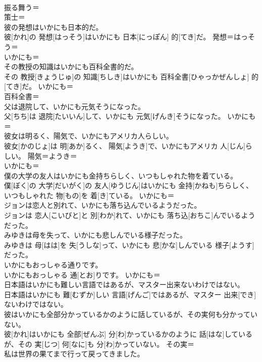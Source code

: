 \documentclass[8pt]{extreport}
\begin{document}
\begin{CJK}{UTF8}{min}
\\	振る舞う＝ 
\\	策士＝ 
\\	彼の発想はいかにも日本的だ。	
\\	彼[かれ]の 発想[はっそう]はいかにも 日本[にっぽん] 的[てき]だ。	発想＝はっそう＝ 
\\	いかにも＝ 
\\	その教授の知識はいかにも百科全書的だ。	
\\	その 教授[きょうじゅ]の 知識[ちしき]はいかにも 百科全書[ひゃっかぜんしょ] 的[てき]だ。	いかにも＝ 
\\	百科全書＝ 
\\	父は退院して、いかにも元気そうになった。	
\\	父[ちち]は 退院[たいいん]して、いかにも 元気[げんき]そうになった。	いかにも＝ 
\\	彼女は明るく、陽気で、いかにもアメリカ人らしい。	
\\	彼女[かのじょ]は 明[あか]るく、 陽気[ようき]で、いかにもアメリカ 人[じん]らしい。	陽気＝ようき＝ 
\\	いかにも＝ 
\\	僕の大学の友人はいかにも金持ちらしく、いつもしゃれた物を着ている。	
\\	僕[ぼく]の 大学[だいがく]の 友人[ゆうじん]はいかにも 金持[かねも]ちらしく、いつもしゃれた 物[もの]を 着[き]ている。	いかにも＝ 
\\	ジョンは恋人と別れて、いかにも落ち込んでいるようだった。	
\\	ジョンは 恋人[こいびと]と 別[わか]れて、いかにも 落ち込[おちこ]んでいるようだった。	
\\	みゆきは母を失って、いかにも悲しんでいる様子だった。	
\\	みゆきは 母[はは]を 失[うしな]って、いかにも 悲[かな]しんでいる 様子[ようす]だった。	
\\	いかにもおっしゃる通りです。	
\\	いかにもおっしゃる 通[とお]りです。	いかにも＝ 
\\	日本語はいかにも難しい言語ではあるが、マスター出来ないわけではない。	
\\	日本語はいかにも 難[むずか]しい 言語[げんご]ではあるが、マスター 出来[でき]ないわけではない。	
\\	彼はいかにも全部分かっているかのように話しているが、その実何も分かっていない。	
\\	彼[かれ]はいかにも 全部[ぜんぶ] 分[わ]かっているかのように 話[はな]しているが、その 実[じつ] 何[なに]も 分[わ]かっていない。	その実＝ 
\\	私は世界の果てまで行って戻ってきました。	

\end{CJK}
\end{document}
